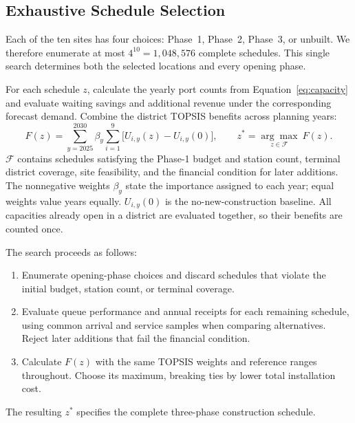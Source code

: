 \documentclass[12pt]{article}
\begin{document}
\subsection{Exhaustive Schedule Selection}
\label{sec:schedules}
Each of the ten sites has four choices: Phase~1, Phase~2, Phase~3, or unbuilt.
We therefore enumerate at most $4^{10}=1,048,576$ complete schedules. This single search
determines both the selected locations and every opening phase.

For each schedule $z$, calculate the yearly port counts from Equation~\ref{eq:capacity}
and evaluate waiting savings and additional revenue under the corresponding forecast
demand. Combine the district TOPSIS benefits across planning years:
\begin{equation}
F(z)=\sum_{y=2025}^{2030}\beta_y\sum_{i=1}^{9}
\bigl[U_{i,y}(z)-U_{i,y}(0)\bigr],\qquad
z^*=\underset{z\in\mathcal F}{\arg\max}\ F(z).
\label{eq:schedule-objective}
\end{equation}
$\mathcal F$ contains schedules satisfying the Phase-1 budget and station count,
terminal district coverage, site feasibility, and the financial condition for later
additions. The nonnegative weights $\beta_y$ state the importance assigned to each
year; equal weights value years equally. $U_{i,y}(0)$ is the no-new-construction
baseline. All capacities already open in a district are evaluated together, so their
benefits are counted once.

The search proceeds as follows:
\begin{enumerate}
\item Enumerate opening-phase choices and discard schedules that violate the initial
budget, station count, or terminal coverage.
\item Evaluate queue performance and annual receipts for each remaining schedule,
using common arrival and service samples when comparing alternatives. Reject later
additions that fail the financial condition.
\item Calculate $F(z)$ with the same TOPSIS weights and reference ranges throughout.
Choose its maximum, breaking ties by lower total installation cost.
\end{enumerate}
The resulting $z^*$ specifies the complete three-phase construction schedule.
\end{document}
